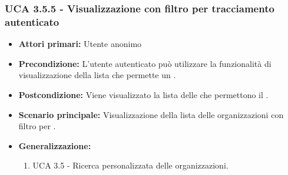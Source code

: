 \subsubsection{UCA 3.5.5 - Visualizzazione con filtro per tracciamento autenticato}%
\begin{itemize}
	\item \textbf{Attori primari:} Utente anonimo
	\item \textbf{Precondizione:} L'utente autenticato può utilizzare la funzionalità di visualizzazione della lista che permette un .
	\item \textbf{Postcondizione:} Viene visualizzato la lista delle  che permettono il .
	\item \textbf{Scenario principale:} Visualizzazione della lista delle organizzazioni con filtro per .
	\item \textbf{Generalizzazione:}
	\begin{enumerate}
	\item UCA 3.5 - Ricerca personalizzata delle organizzazioni.
	\end{enumerate}	
\end{itemize}